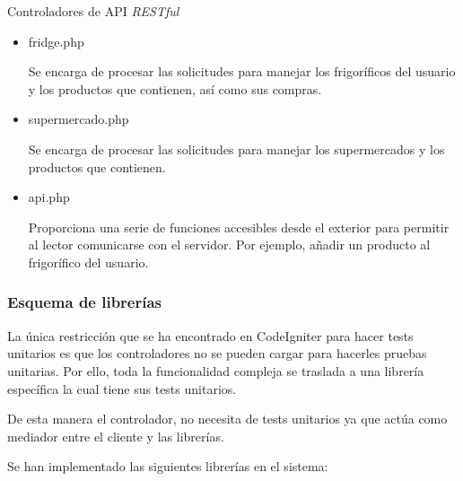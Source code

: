Controladores de API \emph{RESTful}

    \begin{itemize}
        \item fridge.php

            Se encarga de procesar las solicitudes para manejar los frigoríficos del usuario y los productos que contienen, así como sus compras.

        \item supermercado.php

            Se encarga de procesar las solicitudes para manejar los supermercados y los productos que contienen.

        \item api.php

            Proporciona una serie de funciones accesibles desde el exterior para permitir al lector comunicarse con el servidor. Por ejemplo, añadir un producto al frigorífico del usuario.

    \end{itemize}

    \subsubsection{Esquema de librerías}

La única restricción que se ha encontrado en CodeIgniter para hacer tests unitarios es que los controladores no se pueden cargar para hacerles pruebas unitarias. Por ello, toda la funcionalidad compleja se traslada a una librería específica la cual tiene sus tests unitarios.

De esta manera el controlador, no necesita de tests unitarios ya que actúa como mediador entre el cliente y las librerías.

Se han implementado las siguientes librerías en el sistema:

